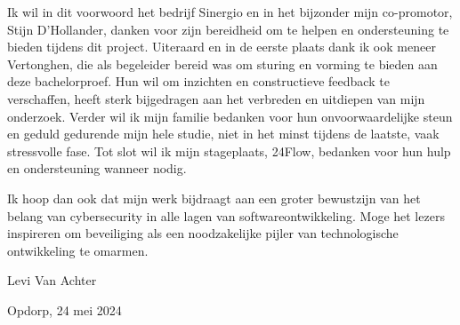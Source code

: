 Ik wil in dit voorwoord het bedrijf Sinergio en in het bijzonder mijn co-promotor, Stijn D'Hollander, danken voor zijn bereidheid om te helpen en ondersteuning te bieden  
tijdens dit project. Uiteraard en in de eerste plaats dank ik ook meneer Vertonghen, die als begeleider bereid was om sturing en vorming te 
bieden aan deze bachelorproef. Hun wil om inzichten en constructieve feedback te verschaffen, heeft sterk bijgedragen aan het verbreden en uitdiepen van mijn onderzoek.
Verder wil ik mijn familie bedanken voor hun onvoorwaardelijke steun en geduld gedurende mijn hele studie, niet in het minst tijdens de laatste, 
vaak stressvolle fase. Tot slot wil ik mijn stageplaats, 24Flow, bedanken voor hun hulp en ondersteuning wanneer nodig.

Ik hoop dan ook dat mijn werk bijdraagt aan een groter bewustzijn van het belang van cybersecurity in alle lagen van softwareontwikkeling. 
Moge het lezers inspireren om beveiliging als een noodzakelijke pijler van technologische ontwikkeling te omarmen.


Levi Van Achter

Opdorp, 24 mei 2024
